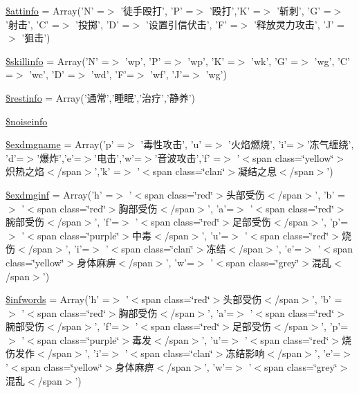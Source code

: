 \begin{DoxyCompactItemize}
\item 
\hyperlink{resources__1_8php_a92eb8a09b2b4554f7502c542f0cdf0d6}{\$attinfo} = Array('N' =$>$ '徒手殴打', 'P' =$>$ '殴打','K' =$>$ '斩刺', 'G' =$>$ '射击', 'C' =$>$ '投掷', 'D' =$>$ '设置引信伏击', 'F' =$>$ '释放灵力攻击', 'J' =$>$ '狙击')
\item 
\hyperlink{resources__1_8php_a94b9a3413b45767e103c4f7ad2346921}{\$skillinfo} = Array('N' =$>$ 'wp', 'P' =$>$ 'wp', 'K' =$>$ 'wk', 'G' =$>$ 'wg', 'C' =$>$ 'wc', 'D' =$>$ 'wd', 'F'=$>$ 'wf', 'J'=$>$ 'wg')
\item 
\hyperlink{resources__1_8php_a9eadda2ba19f193cb5b6d373f4ec6e00}{\$restinfo} = Array('通常','睡眠','治疗','静养')
\item 
\hyperlink{resources__1_8php_a332324f513227af3ea62265b79326383}{\$noiseinfo}
\item 
\hyperlink{resources__1_8php_ae3d186083abb3ad845df2562e1c1df79}{\$exdmgname} = Array('p' =$>$ '毒性攻击', 'u' =$>$ '火焰燃烧', 'i'=$>$'冻气缠绕', 'd'=$>$'爆炸','e'=$>$'电击','w'=$>$'音波攻击','f' =$>$ '$<$span class=\char`\"{}yellow\char`\"{}$>$炽热之焰$<$/span$>$','k' =$>$ '$<$span class=\char`\"{}clan\char`\"{}$>$凝结之息$<$/span$>$')
\item 
\hyperlink{resources__1_8php_a2de6851aa38cafa604576a1dc520e631}{\$exdmginf} = Array('h' =$>$ '$<$span class=\char`\"{}red\char`\"{}$>$头部受伤$<$/span$>$', 'b' =$>$ '$<$span class=\char`\"{}red\char`\"{}$>$胸部受伤$<$/span$>$', 'a'=$>$ '$<$span class=\char`\"{}red\char`\"{}$>$腕部受伤$<$/span$>$', 'f'=$>$ '$<$span class=\char`\"{}red\char`\"{}$>$足部受伤$<$/span$>$', 'p'=$>$ '$<$span class=\char`\"{}purple\char`\"{}$>$中毒$<$/span$>$', 'u'=$>$ '$<$span class=\char`\"{}red\char`\"{}$>$烧伤$<$/span$>$', 'i'=$>$ '$<$span class=\char`\"{}clan\char`\"{}$>$冻结$<$/span$>$', 'e'=$>$ '$<$span class=\char`\"{}yellow\char`\"{}$>$身体麻痹$<$/span$>$', 'w'=$>$ '$<$span class=\char`\"{}grey\char`\"{}$>$混乱$<$/span$>$')
\item 
\hyperlink{resources__1_8php_ac3527ff4180f28da3e03cb071838cc4d}{\$infwords} = Array('h' =$>$ '$<$span class=\char`\"{}red\char`\"{}$>$头部受伤$<$/span$>$', 'b' =$>$ '$<$span class=\char`\"{}red\char`\"{}$>$胸部受伤$<$/span$>$', 'a'=$>$ '$<$span class=\char`\"{}red\char`\"{}$>$腕部受伤$<$/span$>$', 'f'=$>$ '$<$span class=\char`\"{}red\char`\"{}$>$足部受伤$<$/span$>$', 'p'=$>$ '$<$span class=\char`\"{}purple\char`\"{}$>$毒发$<$/span$>$', 'u'=$>$ '$<$span class=\char`\"{}red\char`\"{}$>$烧伤发作$<$/span$>$', 'i'=$>$ '$<$span class=\char`\"{}clan\char`\"{}$>$冻结影响$<$/span$>$', 'e'=$>$ '$<$span class=\char`\"{}yellow\char`\"{}$>$身体麻痹$<$/span$>$', 'w'=$>$ '$<$span class=\char`\"{}grey\char`\"{}$>$混乱$<$/span$>$')

\end{DoxyCompactItemize}
